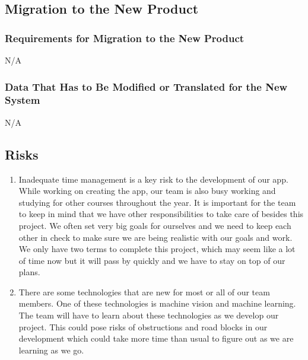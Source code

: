\documentclass[12pt,letterpaper]{article}
\begin{document}
\subsection{Migration to the New Product}

\subsubsection{Requirements for Migration to the New Product}
N/A

\subsubsection{Data That Has to Be Modified or Translated for the New System}
N/A

\subsection{Risks}
\begin{enumerate}
    \item Inadequate time management is a key risk to the development of our
    app. While working on creating the app, our team is also busy working and
    studying for other courses throughout the year. It is important for the team
    to keep in mind that we have other responsibilities to take care of besides
    this project. We often set very big goals for ourselves and we need to keep
    each other in check to make sure we are being realistic with our goals and
    work. We only have two terms to complete this project, which may seem like a
    lot of time now but it will pass by quickly and we have to stay on top of
    our plans.
    
    \item There are some technologies that are new for most or all of our team
    members. One of these technologies is machine vision and machine learning.
    The team will have to learn about these technologies as we develop our
    project. This could pose risks of obstructions and road blocks in our
    development which could take more time than usual to figure out as we are
    learning as we go.
\end{enumerate}
\end{document}
